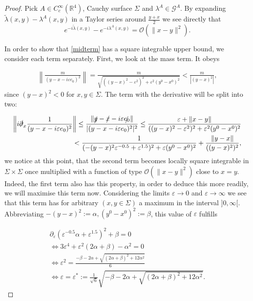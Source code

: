 \documentclass[a4paper,11pt]{article}
\begin{document}
\begin{proof}
Pick \(A\in C_c^\infty(\mathbb{R}^4)\), Cauchy surface \(\Sigma\) and \(\lambda^A\in \mathcal{G}^A\).
By expanding \(\tilde{\lambda}(x,y)-\lambda^A(x,y)\) in a Taylor series around \(\frac{y+x}{2}\) we see directly that
\begin{equation}
e^{-i\tilde{\lambda}(x,y)}-e^{-i\lambda^A(x,y)}=\mathcal{O}(\|x-y\|^2).
\end{equation}

In order to show that \eqref{midterm} has a square integrable upper bound, we consider each term separately.  First, we look at the mass term. 
It obeys

\begin{align}
\left\|\frac{m}{(y-x-i\varepsilon e_0)^2}\right\|= \frac{m}{\sqrt{((y-x)^2-\varepsilon^2)^2+\varepsilon^2(y^0-x^0)^2}}<\frac{m}{|(y-x)^2|},
\end{align}
since \((y-x)^2<0\) for \(x,y\in \Sigma\). The term with the derivative will be split into two:

\begin{align}
\left\| i\slashed{\partial}_x \frac{1}{(y-x-i\varepsilon e_0)^2} \right\|\le \frac{\| \slashed{y}-\slashed{x}-i\varepsilon \slashed{e_0}\|}{| (y-x-i\varepsilon e_0)^2|^2}
\le \frac{\varepsilon + \|x-y\|}{((y-x)^2-\varepsilon^2)^2+\varepsilon^2 (y^0-x^0)^2}\\\label{eq:uglyterm}
<\frac{1}{(-(y-x)^2 \varepsilon^{-0.5}+\varepsilon^{1.5})^2+\varepsilon(y^0-x^0)^2} +\frac{\|y-x\|}{((y-x)^2)^2},
\end{align}
we notice at this point, that the second term becomes locally square integrable in \(\Sigma\times\Sigma\) 
once multiplied with a function of type \(\mathcal{O}(\|x-y\|^2)\) close to \(x=y\). Indeed, the first term also has this property, in order to
deduce this more readily, we will maximise this term now.  Considering the limits \(\varepsilon \rightarrow 0\) and \(\varepsilon \rightarrow \infty\)
we see that this term has for arbitrary \((x,y\in\Sigma)\) a maximum in the interval \(]0,\infty[\). 
Abbreviating \(-(y-x)^2:=\alpha, (y^0-x^0)^2:=\beta\), this value of \(\varepsilon\) fulfills

\begin{align}
\partial_\varepsilon ( \varepsilon^{-0.5}\alpha + \varepsilon^{1.5})^2+\beta=0\\
\iff 3 \varepsilon^4 + \varepsilon^2(2 \alpha+\beta)-\alpha^2=0\\
\iff \varepsilon^2= \frac{-\beta-2\alpha + \sqrt{(2\alpha + \beta)^2+12 \alpha^2}}{6}\\
\iff \varepsilon=\varepsilon^* :=\frac{1}{\sqrt{6}} \sqrt{-\beta-2\alpha + \sqrt{(2\alpha + \beta)^2+12 \alpha^2}}.
\end{align}


\end{proof}
\end{document}

